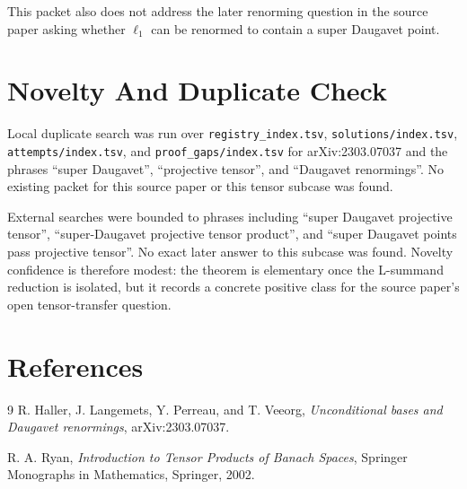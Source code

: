\documentclass[11pt]{article}
\begin{document}
This packet also does not address the later renorming question in the source
paper asking whether \(\ell_1\) can be renormed to contain a super Daugavet
point.

\section*{Novelty And Duplicate Check}

Local duplicate search was run over
\texttt{registry\_index.tsv}, \texttt{solutions/index.tsv},
\texttt{attempts/index.tsv}, and \texttt{proof\_gaps/index.tsv} for
arXiv:2303.07037 and the phrases ``super Daugavet'', ``projective tensor'', and
``Daugavet renormings''.  No existing packet for this source paper or this
tensor subcase was found.

External searches were bounded to phrases including ``super Daugavet
projective tensor'', ``super-Daugavet projective tensor product'', and
``super Daugavet points pass projective tensor''.  No exact later answer to
this subcase was found.  Novelty confidence is therefore modest: the theorem is
elementary once the L-summand reduction is isolated, but it records a concrete
positive class for the source paper's open tensor-transfer question.

\section*{References}

\begin{thebibliography}{9}
R. Haller, J. Langemets, Y. Perreau, and T. Veeorg,
\emph{Unconditional bases and Daugavet renormings},
arXiv:2303.07037.

R. A. Ryan,
\emph{Introduction to Tensor Products of Banach Spaces},
Springer Monographs in Mathematics, Springer, 2002.
\end{thebibliography}
\end{document}
